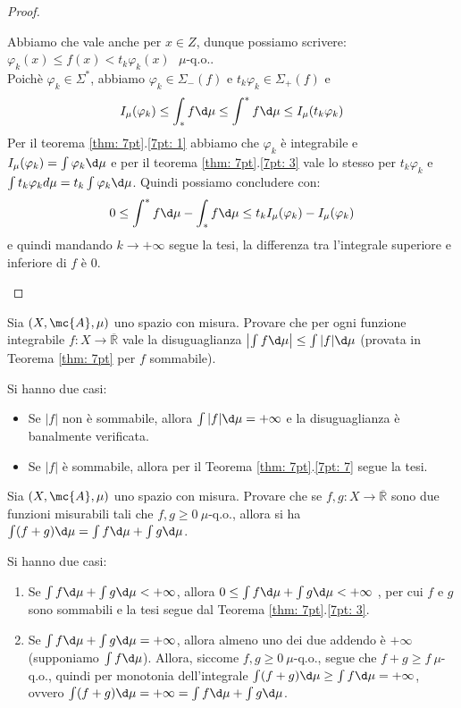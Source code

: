 \begin{proof}
\begin{itemize}
        Abbiamo che vale anche per $x \in Z$, dunque possiamo scrivere: $\varphi_k(x) \le f(x) < t_k\varphi_k(x) \text{ $\mu$-q.o.}$.\\
        Poichè $\varphi_k \in \Sigma^*$, abbiamo $\varphi_k \in \Sigma_-(f)$ e $t_k \varphi_k \in \Sigma_+(f)$ e \[I_\mu (\varphi_k) \le \int_* f \d \mu \le \int^* f \d \mu \le I_\mu (t_k\varphi_k)\]
        Per il teorema \ref{thm: 7pt}.\ref{7pt: 1} abbiamo che $\varphi_k$ è integrabile e $I_\mu(\varphi_k) = \int \varphi_k \d \mu$ e per il teorema \ref{thm: 7pt}.\ref{7pt: 3} vale lo stesso per $t_k \varphi_k$ e $\int t_k \varphi_k d\mu = t_k \int \varphi_k \d \mu$. Quindi possiamo concludere con: \[0 \le \int^* f \d \mu - \int_* f \d \mu \le t_kI_\mu(\varphi_k)-I_\mu(\varphi_k)\] e quindi mandando $k \to +\infty$ segue la tesi, la differenza tra l'integrale superiore e inferiore di $f$ è 0.\qedhere
    \end{itemize}
\end{proof}
\begin{exc}
    Sia $(X, \mc{A}, \mu)$ uno spazio con misura. Provare che per ogni funzione integrabile $f: X \rightarrow \overline{\mathbb{R}}$ vale la disuguaglianza $\left|\int f \d \mu\right| \leq \int|f| \d \mu$ (provata in Teorema \ref{thm: 7pt} per $f$ sommabile).
\end{exc}
\begin{excproof}
    Si hanno due casi:
    \begin{itemize}
        \item Se $|f|$ non è sommabile, allora $\int|f|\d\mu=+\infty$ e la disuguaglianza è banalmente verificata.
        \item Se $|f|$ è sommabile, allora per il Teorema \ref{thm: 7pt}.\ref{7pt: 7} segue la tesi.\qedhere
    \end{itemize}
\end{excproof}

\begin{exc}\label{exc: 2.9}
    Sia $(X, \mc{A}, \mu)$ uno spazio con misura. Provare che se $f, g: X \rightarrow \overline{\mathbb{R}}$ sono due funzioni misurabili tali che $f, g \geq 0 \ \mu$-q.o., allora si ha $\int(f+g) \d \mu=\int f \d \mu+\int g \d \mu$.
\end{exc}
\begin{excproof}
    Si hanno due casi:
    \begin{enumerate}
        \item Se $\int f\d\mu +\int g\d\mu<+\infty$, allora $0\leq \int f\d\mu+\int g\d\mu<+\infty$ , per cui $f$ e $g$ sono sommabili e la tesi segue dal Teorema \ref{thm: 7pt}.\ref{7pt: 3}.
        \item Se $\int f\d\mu+\int g\d\mu = +\infty$, allora almeno uno dei due addendo è $+\infty$ (supponiamo $\int f \d\mu$). Allora, siccome $f,g\geq 0\ \mu$-q.o., segue che $f+g\geq f\ \mu$-q.o., quindi per monotonia dell'integrale $\int(f+g)\d\mu\geq \int f\d\mu=+\infty$, ovvero $\int(f+g)\d\mu = +\infty = \int f\d\mu+\int g\d\mu$.\qedhere
    \end{enumerate}
\end{excproof}

